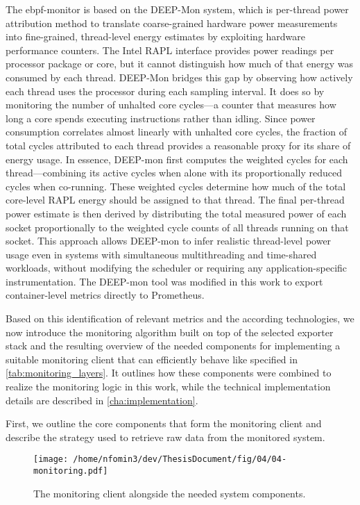 The ebpf-monitor is based on the DEEP-Mon system, which is per-thread power attribution method to translate coarse-grained hardware power measurements into fine-grained, thread-level energy estimates by exploiting hardware performance counters. The Intel RAPL interface provides power readings per processor package or core, but it cannot distinguish how much of that energy was consumed by each thread. DEEP-Mon bridges this gap by observing how actively each thread uses the processor during each sampling interval. It does so by monitoring the number of unhalted core cycles—a counter that measures how long a core spends executing instructions rather than idling. Since power consumption correlates almost linearly with unhalted core cycles, the fraction of total cycles attributed to each thread provides a reasonable proxy for its share of energy usage.
In essence, DEEP-mon first computes the weighted cycles for each thread—combining its active cycles when alone with its proportionally reduced cycles when co-running. These weighted cycles determine how much of the total core-level RAPL energy should be assigned to that thread. The final per-thread power estimate is then derived by distributing the total measured power of each socket proportionally to the weighted cycle counts of all threads running on that socket. This approach allows DEEP-mon to infer realistic thread-level power usage even in systems with simultaneous multithreading and time-shared workloads, without modifying the scheduler or requiring any application-specific instrumentation. The DEEP-mon tool was modified in this work to export container-level metrics directly to Prometheus.

Based on this identification of relevant metrics and the according technologies, we now introduce the monitoring algorithm built on top of the selected exporter stack and the resulting overview of the needed components for implementing a suitable monitoring client that can efficiently behave like specified in \ref{tab:monitoring_layers}. It outlines how these components were combined to realize the monitoring logic in this work, while the technical implementation details are described in \ref{cha:implementation}.

First, we outline the core components that form the monitoring client and describe the strategy used to retrieve raw data from the monitored system.
\begin{figure}[htbp]
    \centering
    \texttt{[image: /home/nfomin3/dev/ThesisDocument/fig/04/04-monitoring.pdf]} %
    \caption{The monitoring client alongside the needed system components.}
    \label{fig:monitoring_client}
\end{figure}

